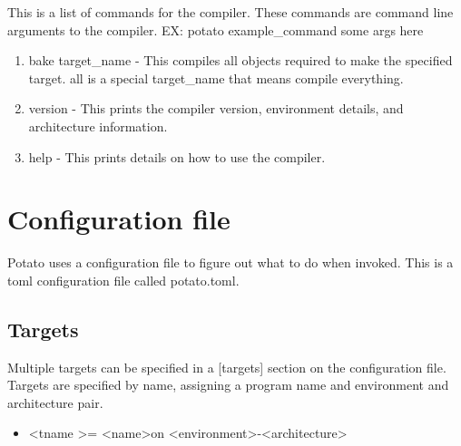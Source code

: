 \documentclass[12pt]{article}
\begin{document}
This is a list of commands for the compiler. These commands are command line arguments to the compiler. EX: potato example\_command some args here

\begin{enumerate}
\item bake target\_name - This compiles all objects required to make the specified target. all is a special target\_name that means compile everything.
\item version - This prints the compiler version, environment details, and architecture information.
\item help - This prints details on how to use the compiler.
\end{enumerate}

\section {Configuration file}
Potato uses a configuration file to figure out what to do when invoked. 
This is a toml configuration file called potato.toml.

\subsection {Targets}
Multiple targets can be specified in a [targets] section on the configuration file. Targets are specified by name, assigning a program name and environment and architecture pair.
\begin {itemize}
\item \textless tname \textgreater = \textless name\textgreater  on \textless environment\textgreater -\textless architecture\textgreater 
\end{itemize}
\end{document}

